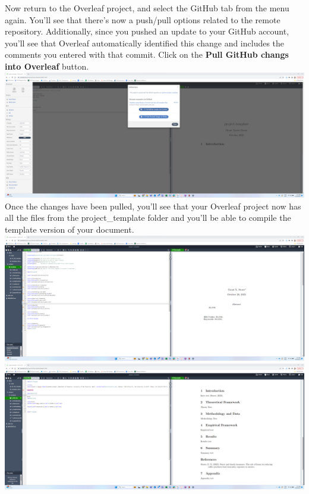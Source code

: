 \documentclass[12pt]{article}
\begin{document}
Now return to the Overleaf project, and select the GitHub tab from the menu again. You'll see that there's now a push/pull options related to the remote repository. Additionally, since you pushed an update to your GitHub account, you'll see that Overleaf automatically identified this change and includes the comments you entered with that commit. Click on the \textbf{Pull GitHub changs into Overleaf} button. \\

\includegraphics[width=1\textwidth]{Instructions/project_template_screenshots/project_template_09.png} \\

Once the changes have been pulled, you'll see that your Overleaf project now has all the files from the project\_template folder and you'll be able to compile the template version of your document. \\

\includegraphics[width=1\textwidth]{Instructions/project_template_screenshots/project_template_10.png} \\

\includegraphics[width=1\textwidth]{Instructions/project_template_screenshots/project_template_11.png} \\
\end{document}
